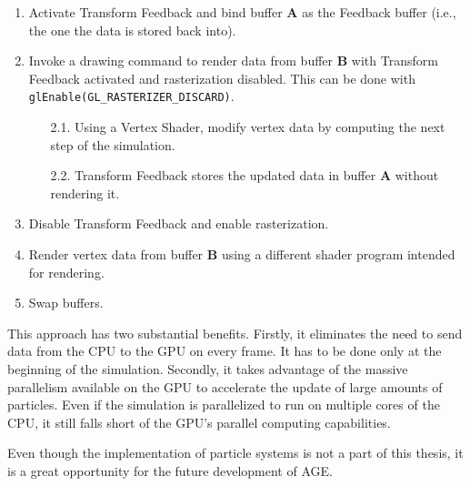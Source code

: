 \documentclass[
  digital,     %
  oneside,     %
  nosansbold,  %
  nocolorbold, %
  lof,         %
  lot,         %
]{fithesis4}
\begin{document}
\begin{enumerate}
    \item Activate Transform Feedback and bind buffer \textbf{A} as the Feedback
    buffer (i.e., the one the data is stored back into).

    \item Invoke a drawing command to render data from buffer \textbf{B} with Transform Feedback activated
    and rasterization disabled. This can be done with \verb+glEnable(GL_RASTERIZER_DISCARD)+.
    \begin{enumerate}
        \item[2.1.] Using a Vertex Shader, modify vertex data by computing the next step of the simulation.
        
        \item[2.2.] Transform Feedback stores the updated data in buffer \textbf{A} without rendering it.
    \end{enumerate}
    
    \item Disable Transform Feedback and enable rasterization.
    
    \item Render vertex data from buffer \textbf{B} using a different shader program intended for rendering.
    
    \item Swap buffers.
\end{enumerate}
This approach has two substantial benefits. Firstly, it eliminates the need to send data from the CPU to the GPU
on every frame. It has to be done only at the beginning of the simulation. Secondly, it takes advantage of the
massive parallelism available on the GPU to accelerate the update of large amounts of particles. Even if the simulation
is parallelized to run on multiple cores of the CPU, it still falls short of the GPU's parallel computing capabilities.

Even though the implementation of particle systems is not a part of this thesis,
it is a great opportunity for the future development of AGE.
\end{document}
